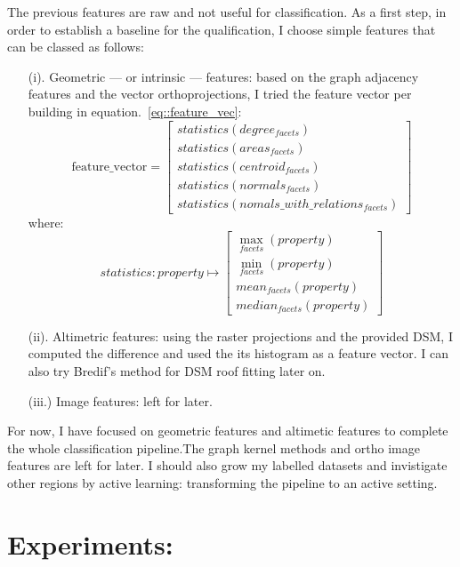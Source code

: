 \documentclass[a4paper, 11pt]{article}
\begin{document}
	The previous features are raw and not useful for classification. As a first
	step, in order to establish a baseline for the qualification, I choose simple
	features that can be classed as follows:
	\begin{itemize}
		\item[(i).] Geometric --- or intrinsic --- features: based on the graph adjacency features and the vector orthoprojections, I tried the feature vector per building in equation.~\ref{eq::feature_vec}:
		\begin{equation}\label{eq::feature_vec}
			\text{feature\_vector} = \begin{bmatrix}
				statistics(degree_{facets})\\
				statistics(areas_{facets})\\
				statistics(centroid_{facets})\\
				statistics(normals_{facets})\\
				statistics(nomals\_with\_relations_{facets})
		\end{bmatrix}
		\end{equation}
		where:
		\begin{equation}
			statistics: property \mapsto \begin{bmatrix}
			\max_{facets}(property)\\
			\min_{facets}(property)\\
			mean_{facets}(property)\\
			median_{facets}(property)
		\end{bmatrix}
		\end{equation}
		\item[(ii).] Altimetric features: using the raster projections and the provided DSM, I computed the difference and used the its histogram as a feature vector. I can also try Bredif's method for DSM roof fitting later on.
		\item[(iii.)] Image features: left for later.
	\end{itemize}

	For now, I have focused on geometric features and altimetic features to complete the whole classification pipeline.The graph kernel methods and ortho image features are left for later. I should also grow my labelled datasets and invistigate other regions by active learning: transforming the pipeline to an active setting.

	\section{Experiments:}
~\\
\end{document}
